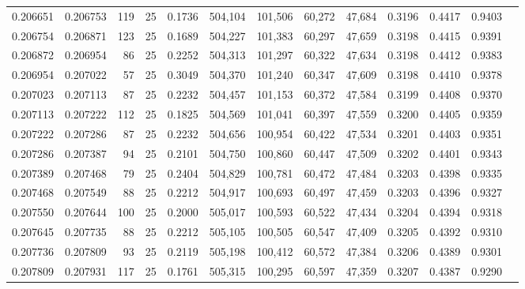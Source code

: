 \begin{tabular}{rrrrrrrrrrrrr}
0.206651 & 0.206753 &   119 &  25 &                                     0.1736 & 504,104 & 101,506 &  60,272 &  47,684 & 0.3196 & 0.4417 & 0.9403 \\
0.206754 & 0.206871 &   123 &  25 &                                     0.1689 & 504,227 & 101,383 &  60,297 &  47,659 & 0.3198 & 0.4415 & 0.9391 \\
0.206872 & 0.206954 &    86 &  25 &                                     0.2252 & 504,313 & 101,297 &  60,322 &  47,634 & 0.3198 & 0.4412 & 0.9383 \\
0.206954 & 0.207022 &    57 &  25 &                                     0.3049 & 504,370 & 101,240 &  60,347 &  47,609 & 0.3198 & 0.4410 & 0.9378 \\
0.207023 & 0.207113 &    87 &  25 &                                     0.2232 & 504,457 & 101,153 &  60,372 &  47,584 & 0.3199 & 0.4408 & 0.9370 \\
0.207113 & 0.207222 &   112 &  25 &                                     0.1825 & 504,569 & 101,041 &  60,397 &  47,559 & 0.3200 & 0.4405 & 0.9359 \\
0.207222 & 0.207286 &    87 &  25 &                                     0.2232 & 504,656 & 100,954 &  60,422 &  47,534 & 0.3201 & 0.4403 & 0.9351 \\
0.207286 & 0.207387 &    94 &  25 &                                     0.2101 & 504,750 & 100,860 &  60,447 &  47,509 & 0.3202 & 0.4401 & 0.9343 \\
0.207389 & 0.207468 &    79 &  25 &                                     0.2404 & 504,829 & 100,781 &  60,472 &  47,484 & 0.3203 & 0.4398 & 0.9335 \\
0.207468 & 0.207549 &    88 &  25 &                                     0.2212 & 504,917 & 100,693 &  60,497 &  47,459 & 0.3203 & 0.4396 & 0.9327 \\
0.207550 & 0.207644 &   100 &  25 &                                     0.2000 & 505,017 & 100,593 &  60,522 &  47,434 & 0.3204 & 0.4394 & 0.9318 \\
0.207645 & 0.207735 &    88 &  25 &                                     0.2212 & 505,105 & 100,505 &  60,547 &  47,409 & 0.3205 & 0.4392 & 0.9310 \\
0.207736 & 0.207809 &    93 &  25 &                                     0.2119 & 505,198 & 100,412 &  60,572 &  47,384 & 0.3206 & 0.4389 & 0.9301 \\
0.207809 & 0.207931 &   117 &  25 &                                     0.1761 & 505,315 & 100,295 &  60,597 &  47,359 & 0.3207 & 0.4387 & 0.9290 \\

\end{tabular}
